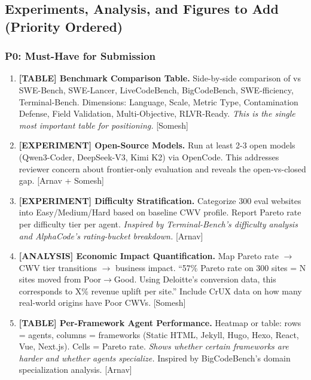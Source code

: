 \subsection{Experiments, Analysis, and Figures to Add (Priority Ordered)}

\subsubsection{P0: Must-Have for Submission}

\begin{enumerate}
    \item \textbf{[TABLE] Benchmark Comparison Table.} Side-by-side comparison of \OurBench vs SWE-Bench, SWE-Lancer, LiveCodeBench, BigCodeBench, SWE-fficiency, Terminal-Bench. Dimensions: Language, Scale, Metric Type, Contamination Defense, Field Validation, Multi-Objective, RLVR-Ready. \textit{This is the single most important table for positioning.} [Somesh]

    \item \textbf{[EXPERIMENT] Open-Source Models.} Run at least 2-3 open models (Qwen3-Coder, DeepSeek-V3, Kimi K2) via OpenCode. This addresses reviewer concern about frontier-only evaluation and reveals the open-vs-closed gap. [Arnav + Somesh]

    \item \textbf{[EXPERIMENT] Difficulty Stratification.} Categorize 300 eval websites into Easy/Medium/Hard based on baseline CWV profile. Report Pareto rate per difficulty tier per agent. \textit{Inspired by Terminal-Bench's difficulty analysis and AlphaCode's rating-bucket breakdown.} [Arnav]

    \item \textbf{[ANALYSIS] Economic Impact Quantification.} Map Pareto rate $\rightarrow$ CWV tier transitions $\rightarrow$ business impact. ``57\% Pareto rate on 300 sites = N sites moved from Poor$\rightarrow$Good. Using Deloitte's conversion data, this corresponds to X\% revenue uplift per site.'' Include CrUX data on how many real-world origins have Poor CWVs. [Somesh]

    \item \textbf{[TABLE] Per-Framework Agent Performance.} Heatmap or table: rows = agents, columns = frameworks (Static HTML, Jekyll, Hugo, Hexo, React, Vue, Next.js). Cells = Pareto rate. \textit{Shows whether certain frameworks are harder and whether agents specialize.} Inspired by BigCodeBench's domain specialization analysis. [Arnav]
\end{enumerate}

